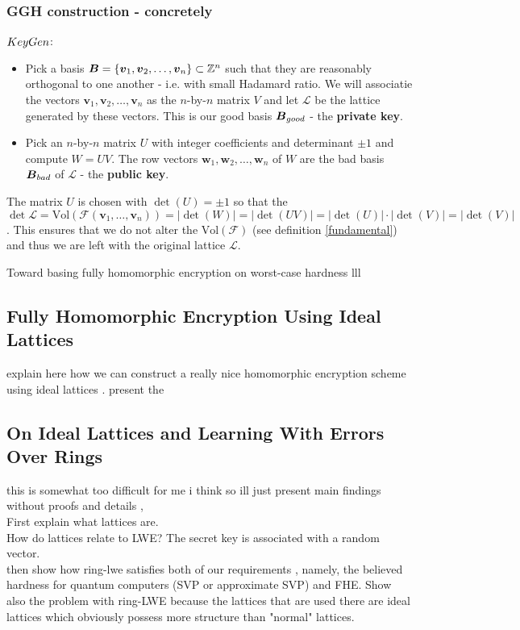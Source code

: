 \subsubsection*{GGH construction - concretely}
$KeyGen$:
\begin{itemize}
    \item Pick a basis $\boldsymbol{B} = \{\boldsymbol{v}_1, \boldsymbol{v}_2, \dots, \boldsymbol{v}_n\} \subset \mathbb{Z}^n$ such that they are reasonably orthogonal to one another - i.e. with small Hadamard ratio. We will associatie the vectors $\bm{v}_1, \bm{v}_2, \dots, \bm{v}_n$ as the $n$-by-$n$ matrix $V$ and let $\mathcal{L}$ be the lattice generated by these vectors. This is our good basis $\boldsymbol{B}_{good}$ - the \textbf{private key}.
    \item Pick an $n$-by-$n$ matrix $U$ with integer coefficients and determinant $\pm 1$ and compute $W = UV$. The row vectors $\bm{w}_1, \bm{w}_2, \dots, \bm{w}_n$ of $W$ are the bad basis $\boldsymbol{B}_{bad}$ of $\mathcal{L}$ - the \textbf{public key}.
\end{itemize}
\begin{remark}
    The matrix $U$ is chosen with $\det (U) = \pm 1$ so that the $\det \mathcal{L} = \text{Vol} (\mathcal{F}(\bm{v}_1, \dots, \bm{v}_n)) = | \det (W) | = | \det(UV) | = | \det(U) | \cdot | \det(V) | = | \det(V) |$. This ensures that we do not alter the $\text{Vol} (\mathcal{F})$ (see definition \ref{fundamental}) and thus we are left with the original lattice $\mathcal{L}$.
\end{remark}

Toward basing fully homomorphic encryption on worst-case hardness
lll

\subsection{Fully Homomorphic Encryption Using Ideal Lattices}
explain here how we can construct a really nice homomorphic encryption scheme using ideal lattices \cite{gentry}. present the 
\subsection{On Ideal Lattices and Learning With Errors Over Rings}
this is somewhat too difficult for me i think so ill just present main findings without proofs and details \cite{regev}, \cite{ring-lwe} \\
First explain what lattices are. \\
How do lattices relate to LWE? The secret key is associated with a random vector. \\
then show how ring-lwe satisfies both of our requirements \cite{ring-lwe}, namely, the believed hardness for quantum computers (SVP or approximate SVP) and FHE. Show also the problem with ring-LWE because the lattices that are used there are ideal lattices which obviously possess more structure than "normal" lattices.
